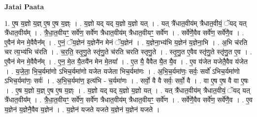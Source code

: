 \documentclass[17pt]{extarticle}
\begin{document}
\textbf{Jatai Paata} \newline

1. ए॒ष य॒ज्ञो य॒ज्ञ् ए॒ष ए॒ष य॒ज्ञ्ः । . य॒ज्ञो यद् यद् य॒ज्ञो य॒ज्ञो यत् । . यत् त्रै॑धात॒वीय॑म् त्रैधात॒वीयं॒ ॅयद् यत् त्रै॑धात॒वीय᳚म् । . त्रै॒धा॒त॒वीयꣳ॒॒ सर्वे॑ण॒ सर्वे॑ण त्रैधात॒वीय॑म् त्रैधात॒वीयꣳ॒॒ सर्वे॑ण । . सर्वे॑णै॒वैव सर्वे॑ण॒ सर्वे॑णै॒व । . ए॒वैन॑ मेन मे॒वैवैन᳚म् । . ए॒नं॒ ॅय॒ज्ञेन॑ य॒ज्ञेनै॑न मेनं ॅय॒ज्ञेन॑ । . य॒ज्ञेना॒भ्य॑भि य॒ज्ञेन॑ य॒ज्ञेना॒भि । . अ॒भि च॑रति चर त्य॒भ्य॑भि च॑रति । . च॒र॒ति॒ स्तृ॒णु॒ते स्तृ॑णु॒ते च॑रति चरति स्तृणु॒ते । . स्तृ॒णु॒त ए॒वैव स्तृ॑णु॒ते स्तृ॑णु॒त ए॒व । . ए॒वैन॑ मेन मे॒वैवैन᳚म् । . ए॒न॒ मे॒त यै॒तयै॑न मेन मे॒तया᳚ । . ए॒त यै॒ वैवैत यै॒त यै॒व । . ए॒व य॑जेत यजेतै॒वैव य॑जेत । . य॒जे॒ता॒ भि॒च॒र्यमा॑णो ऽभिच॒र्यमा॑णो यजेत यजेता भिच॒र्यमा॑णः । . अ॒भि॒च॒र्यमा॑णः॒ सर्वः॒ सर्वो॑ ऽभिच॒र्यमा॑णो ऽभिच॒र्यमा॑णः॒ सर्वः॑ । . अ॒भि॒च॒र्यमा॑ण॒ इत्य॑भि - च॒र्यमा॑णः । . सर्वो॒ वै वै सर्वः॒ सर्वो॒ वै । . वा ए॒ष ए॒ष वै वा ए॒षः । . ए॒ष य॒ज्ञो य॒ज्ञ् ए॒ष ए॒ष य॒ज्ञ्ः । . य॒ज्ञो यद् यद् य॒ज्ञो य॒ज्ञो यत् । . यत् त्रै॑धात॒वीय॑म् त्रैधात॒वीयं॒ ॅयद् यत् त्रै॑धात॒वीय᳚म् । . त्रै॒धा॒त॒वीयꣳ॒॒ सर्वे॑ण॒ सर्वे॑ण त्रैधात॒वीय॑म् त्रैधात॒वीयꣳ॒॒ सर्वे॑ण । . सर्वे॑णै॒वैव सर्वे॑ण॒ सर्वे॑णै॒व । . ए॒व य॒ज्ञेन॑ य॒ज्ञेनै॒वैव य॒ज्ञेन॑ । . य॒ज्ञेन॑ यजते यजते य॒ज्ञेन॑ य॒ज्ञेन॑ यजते । \newline
\end{document}
